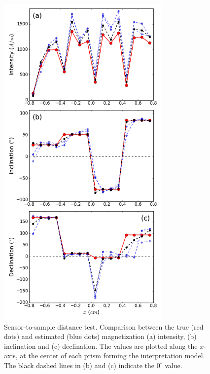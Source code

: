 \documentclass[draft,gc]{agutex}
\begin{document}
 \begin{figure}
 \noindent \includegraphics[width=20pc]{Figs/Fig10_LQ.png}
 \caption{Sensor-to-sample distance test. Comparison between the true (red dots)
 and estimated (blue dots) magnetization (a) intensity, (b) inclination 
 and (c) declination.
 The values are plotted along the $x$-axis, at the center of each 
 prism forming the interpretation model.
 The black dashed lines in (b) and (c) indicate the $0^{\circ}$ value.}
 \label{fig:estimate-sensor2sample}
 \end{figure}
 
\end{document}

